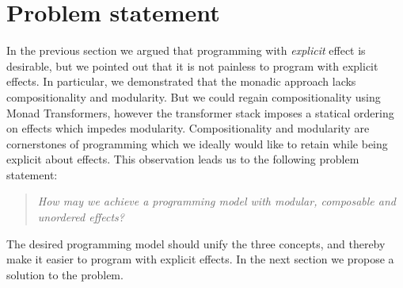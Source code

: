 \section{Problem statement}
In the previous section we argued that programming with \emph{explicit} effect is desirable, but we pointed out that it is not painless to program with explicit effects. In particular, we demonstrated that the monadic approach lacks compositionality and modularity. But we could regain compositionality using Monad Transformers, however the transformer stack imposes a statical ordering on effects which impedes modularity. Compositionality and modularity are cornerstones of programming which we ideally would like to retain while being explicit about effects. This observation leads us to the following problem statement:
\begin{quote}
  \emph{How may we achieve a programming model with modular, composable and unordered effects?}
\end{quote}
The desired programming model should unify the three concepts, and thereby make it easier to program with explicit effects. In the next section we propose a solution to the problem.
